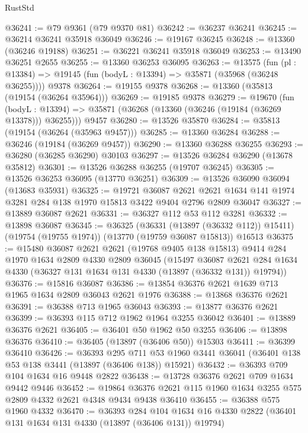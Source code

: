 \begin{lexlean}{RustStd}
\begin{coremodule}
@36241 := @79 @9361 (@79 @9370 @81)
@36242 := @36237 @36241
@36245 := @36214 @36241 @35918 @36049
@36246 := @19167 @36245
@36248 := @13360 (@36246 @19188)
@36251 := @36221 @36241 @35918 @36049
@36253 := @13490 @36251 @2655
@36255 := @13360 @36253 @36095
@36263 := @13575
    (fun (pl : @13384) => @19145 (fun (bodyL : @13394) => @35871 (@35968 (@36248 @36255))))
    @9378
@36264 := @19155 @9378
@36268 := @13360 (@35813 (@19154 (@36264 @35964)))
@36269 := @19185 @9378
@36279 := @19670
    (fun (bodyL : @13394) => @35871 (@36268 (@13360 (@36246 (@19184 (@36269 @13378))) @36255)))
    @9457
@36280 := @13526 @35870
@36284 := @35813 (@19154 (@36264 (@35963 @9457)))
@36285 := @13360 @36284
@36288 := @36246 (@19184 (@36269 @9457))
@36290 := @13360 @36288 @36255
@36293 := @36280 (@36285 @36290) @30103
@36297 := @13526 @36284 @36290 (@13678 @35812)
@36301 := @13526 @36288 @36255 (@19707 @36245)
@36305 := @13526 @36253 @36095 (@13770 @36251)
@36309 := @13526 @36090 @36094 (@13683 @35931)
@36325 := @19721
    @36087
    @2621
    @2621
    @1634
    @141
    @1974
    @3281
    @284
    @138
    @1970
    @15813
    @3422
    @9404
    @2796
    @2809
    @36047
@36327 := @13889 @36087 @2621
@36331 := @36327 @112 @53 @112 @3281
@36332 := @13898 @36087
@36345 := @36325
    (@36331 (@13897 (@36332 @112)) @15411)
    (@19754 (@19755 @1974))
    (@13770 (@19759 @36087 @15813))
    @16513
@36375 := @15480
    @36087
    @2621
    @2621
    (@19768 @9405 @138 @15813)
    @9414
    @284
    @1970
    @1634
    @2809
    @4330
    @2809
    @36045
    (@15497
      @36087
      @2621
      @284
      @1634
      @4330
      (@36327 @131 @1634 @131 @4330 (@13897 (@36332 @131)) @19794))
@36376 := @15816 @36087
@36386 := @13854 @36376 @2621 @1639 @713 @1965 @1634 @2809 @36043 @2621 @1976
@36388 := @13868 @36376 @2621
@36391 := @36388 @713 @1965 @36043
@36393 := @13877 @36376 @2621
@36399 := @36393 @115 @712 @1962 @1964 @3255 @36042
@36401 := @13889 @36376 @2621
@36405 := @36401 @50 @1962 @50 @3255
@36406 := @13898 @36376
@36410 := @36405 (@13897 (@36406 @50)) @15303
@36411 := @36399 @36410
@36426 := @36393
    @295
    @711
    @53
    @1960
    @3441
    @36041
    (@36401 @138 @53 @138 @3441 (@13897 (@36406 @138)) @15921)
@36432 := @36393 @709 @104 @1634 @16 @9448 @2822
@36438 := @13728 @36376 @2621 @709 @1634 @9442 @9446
@36452 := @19864 @36376 @2621 @115 @1960 @1634 @3255 @575 @2809 @4332 @2621 @4348 @9434 @9438 @36410
@36455 := @36388 @575 @1960 @4332
@36470 := @36393
    @284
    @104
    @1634
    @16
    @4330
    @2822
    (@36401 @131 @1634 @131 @4330 (@13897 (@36406 @131)) @19794)

\end{coremodule}
\end{lexlean}
